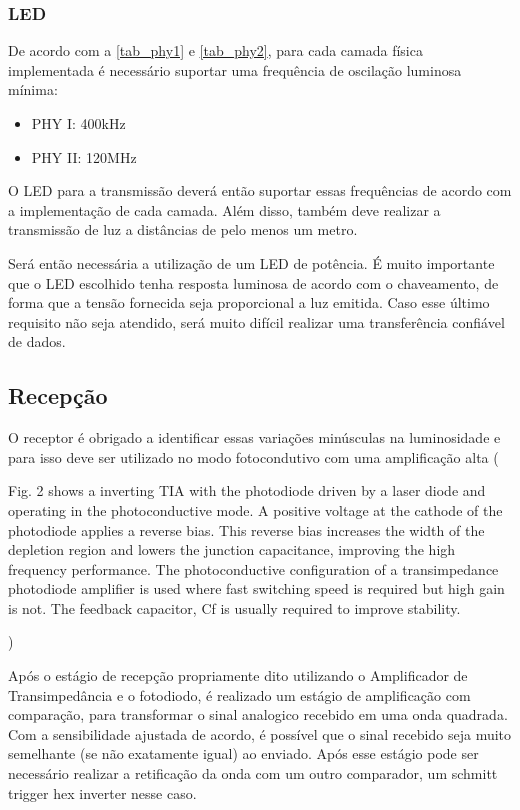 	\subsubsection{LED}\label{hard-led}
	
	De acordo com a \autoref{tab_phy1} e \autoref{tab_phy2}, para cada camada física implementada é necessário suportar uma frequência de oscilação luminosa mínima:
	
	\begin{itemize}
		\item PHY I: 400kHz
		\item PHY II: 120MHz
	\end{itemize} 
	
	O LED para a transmissão deverá então suportar essas frequências de acordo com a implementação de cada camada. Além disso, também deve realizar a transmissão de luz a distâncias de pelo menos um metro.
	
	Será então necessária a utilização de um LED de potência. É muito importante que o LED escolhido tenha resposta luminosa de acordo com o chaveamento, de forma que a tensão fornecida seja proporcional a luz emitida. Caso esse último requisito não seja atendido, será muito difícil realizar uma transferência confiável de dados.
	
	\subsection{Recepção}
	
	O receptor é obrigado a identificar essas variações minúsculas na luminosidade e para isso deve ser utilizado no modo fotocondutivo com uma amplificação alta (
	
	Fig. 2 shows a inverting TIA with the photodiode driven by a laser diode and operating in the photoconductive mode. A positive voltage at the cathode of the photodiode applies a reverse bias. This reverse bias increases the width of the depletion region and lowers the junction capacitance, improving the high frequency performance. The photoconductive configuration of a transimpedance photodiode amplifier is used where fast switching speed is required but high gain is not. The feedback capacitor, Cf is usually required to improve stability.
	
	)
	
	Após o estágio de recepção propriamente dito utilizando o Amplificador de Transimpedância e o fotodiodo, é realizado um estágio de amplificação com comparação, para transformar o sinal analogico recebido em uma onda quadrada. Com a sensibilidade ajustada de acordo, é possível que o sinal recebido seja muito semelhante (se não exatamente igual) ao enviado. Após esse estágio pode ser necessário realizar a retificação da onda com um outro comparador, um schmitt trigger hex inverter nesse caso.
	
